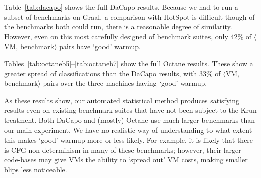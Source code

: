 \documentclass[acmsmall]{acmart}\settopmatter{printfolios=true}
\newcommand{\krun}{Krun\xspace}
\newcommand{\bencherfive}{Linux$_\mathrm{4790}$\xspace}
\newcommand{\benchersix}{OpenBSD$_\mathrm{4790}$\xspace}
\newcommand{\vmbpair}{$\langle$VM, benchmark$\rangle$\xspace}
\begin{document}
Table~\ref{tab:dacapo} shows the full DaCapo results. Because we had to run
a subset of benchmarks on Graal, a comparison with HotSpot is difficult
though of the benchmarks both could run, there is a reasonable degree
of similarity. However, even on this most carefully designed of benchmark suites, only 42\%
of \vmbpair pairs have `good' warmup.

Tables~\ref{tab:octaneb5}--\ref{tab:octaneb7} show the full Octane results. These
show a greater spread of classifications than the DaCapo results, with
33\% of \vmbpair pairs over the three machines having `good' warmup.

As these results show, our automated statistical method produces satisfying
results even on existing benchmark suites that have not been subject to the
\krun treatment. Both DaCapo and (mostly) Octane use much larger benchmarks than
our main experiment. We have no realistic way of understanding to what extent
this makes `good' warmup more or less likely. For example, it is likely that
there is CFG non-determinism in many of these benchmarks; however, their larger
code-bases may give VMs the ability to `spread out' VM costs, making smaller
blips less noticeable.

\begin{landscape}
\begin{table}[htp]
\centering
\begin{adjustbox}{scale=.9}

\end{adjustbox}
\caption{DaCapo results for \bencherfive.}
\label{tab:dacapo}
\end{table}
\end{landscape}


\begin{landscape}
\begin{table}[htp]
\centering
\begin{adjustbox}{scale=.9}

\end{adjustbox}
\caption{Octane results for \bencherfive.}
\label{tab:octaneb5}
\end{table}
\end{landscape}

\begin{table}[htp]
\centering
\begin{adjustbox}{scale=.9}

\end{adjustbox}
\caption{Octane results for \benchersix.}
\label{tab:octaneb6}
\end{table}
\end{document}
